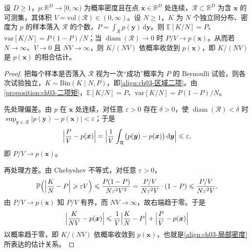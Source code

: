 \documentclass[../../main.tex]{subfiles}
\begin{document}
\begin{proposition}[局部密度估计]\label{proposition:ch03-局部密度}
设 $D\geqslant1$，$p:\mathbb{R}^{D}\to[0,\infty)$ 为概率密度且在点 $\boldsymbol{x}\in\mathbb{R}^{D}$ 处连续，$\mathcal{R}\subset\mathbb{R}^{D}$ 为含 $\boldsymbol{x}$ 的可测集，其体积 $V=\mathrm{vol}(\mathcal{R})\in(0,\infty)$。设 $N\geqslant1$，$K$ 为 $N$ 个独立同分布、密度为 $p$ 的样本落入 $\mathcal{R}$ 的个数，$P=\int_{\mathcal{R}}p(\boldsymbol{y})\,\mathrm{d}\boldsymbol{y}$。则 $\mathbb{E}[K/N]=P$、$\mathrm{var}[K/N]=P(1-P)/N$；当 $\operatorname{diam}(\mathcal{R})\to0$ 时 $P/V\to p(\boldsymbol{x})$。从而若 $N\to\infty$、$V\to0$ 且 $NV\to\infty$，则 $K/(NV)$ 依概率收敛到 $p(\boldsymbol{x})$，即 $K/(NV)$ 是 $p(\boldsymbol{x})$ 的相合估计。
\end{proposition}
\begin{proof}
把每个样本是否落入 $\mathcal{R}$ 视为一次“成功”概率为 $P$ 的 Bernoulli 试验，则各次试验独立，$K\sim\mathrm{Bin}(K\mid N,P)$，即\eqref{align:ch03-区域二项}。由\cref{proposition:ch03-二项矩}，$\mathbb{E}[K/N]=P$、$\mathrm{var}[K/N]=P(1-P)/N$。

先处理偏差。由 $p$ 在 $\boldsymbol{x}$ 处连续，对任意 $\varepsilon>0$ 存在 $\delta>0$，使 $\operatorname{diam}(\mathcal{R})<\delta$ 时 $\sup_{\boldsymbol{y}\in\mathcal{R}}\lvert p(\boldsymbol{y})-p(\boldsymbol{x})\rvert<\varepsilon$；于是
\begin{align*}
\Bigl\lvert\frac{P}{V}-p(\boldsymbol{x})\Bigr\rvert=\Bigl\lvert\frac{1}{V}\int_{\mathcal{R}}\bigl(p(\boldsymbol{y})-p(\boldsymbol{x})\bigr)\,\mathrm{d}\boldsymbol{y}\Bigr\rvert\leqslant\varepsilon,
\end{align*}
即 $P/V\to p(\boldsymbol{x})$。

再处理方差。由 Chebyshev 不等式，对任意 $\varepsilon>0$，
\begin{align*}
\mathbb{P}\Bigl(\Bigl\lvert\frac{K}{N}-P\Bigr\rvert\geqslant\varepsilon V\Bigr)\leqslant\frac{P(1-P)}{N\varepsilon^{2}V^{2}}=\frac{P/V}{N\varepsilon^{2}V}\cdot(1-P)\leqslant\frac{P/V}{N\varepsilon^{2}V}.
\end{align*}
由 $P/V\to p(\boldsymbol{x})$ 知 $P/V$ 有界，而 $NV\to\infty$，故右端趋于零。于是
\begin{align*}
\Bigl\lvert\frac{K}{NV}-p(\boldsymbol{x})\Bigr\rvert\leqslant\frac{1}{V}\Bigl\lvert\frac{K}{N}-P\Bigr\rvert+\Bigl\lvert\frac{P}{V}-p(\boldsymbol{x})\Bigr\rvert
\end{align*}
以概率趋于零，即 $K/(NV)$ 依概率收敛到 $p(\boldsymbol{x})$，也就是\eqref{align:ch03-局部密度}所表达的估计关系。
\end{proof}
\end{document}
